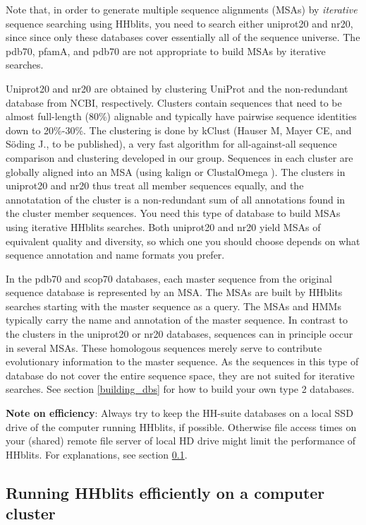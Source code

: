 \documentclass[11pt,a4paper]{article}
\begin{document}
Note that, in order to generate multiple sequence alignments (MSAs) by \emph{iterative} sequence searching using HHblits, you need to search either uniprot20 and nr20, since since only these databases cover essentially all of the sequence 
universe. The pdb70, pfamA, and pdb70 are not appropriate to build MSAs by iterative searches.

Uniprot20 and nr20 are obtained by clustering UniProt \cite{uniprot:2010} and the non-redundant database from NCBI, respectively. Clusters  contain sequences that need to be almost full-length (80\%) alignable and typically have pairwise sequence identities down to 20\%-30\%. The clustering is done by kClust (Hauser M, Mayer CE, and S\"oding J., to be published), a very fast algorithm for all-against-all sequence comparison and clustering developed in our group. Sequences in each cluster are globally aligned into an MSA (using kalign or ClustalOmega \cite{Higgins:2011}). The clusters in uniprot20 and nr20 thus treat all member sequences equally, and the annotatation of the cluster is a non-redundant sum of all annotations found in the cluster member sequences. You need this type of database to build MSAs using iterative HHblits searches. Both uniprot20 and nr20 yield MSAs of equivalent quality and diversity, so which one you should choose depends on what sequence annotation and name formats you prefer. 

In the pdb70 and scop70 databases, each master sequence from the original sequence database is represented by an MSA. The MSAs are built by HHblits searches starting with the master sequence as a query. The MSAs and HMMs typically carry the name and annotation of the master sequence. In contrast to the clusters in the uniprot20 or nr20 databases, sequences can in principle occur in several MSAs. These homologous sequences merely serve to contribute evolutionary information to the master sequence. As the sequences in this type of database do not cover the entire sequence space, they are not suited for iterative searches. See  section \ref{building_dbs} for how to build your own type 2 databases.

{\bf Note on efficiency}: Always try to keep the HH-suite databases on a local SSD drive of the computer running HHblits, if possible. Otherwise file access times on your (shared) remote file server of local HD drive might limit the performance of HHblits. For explanations, see section \ref{efficiency}.


\subsection{Running HHblits efficiently on a computer cluster} \label{efficiency}
\end{document}
